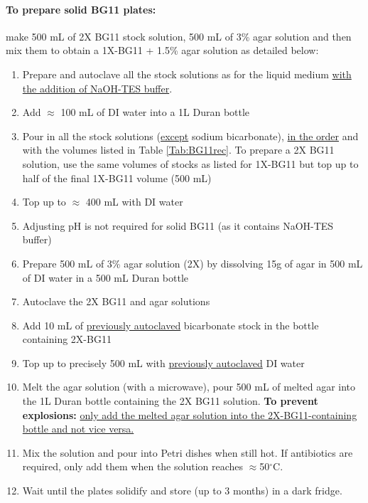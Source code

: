 \documentclass[12pt]{article}
\begin{document}
    \paragraph{To prepare solid BG11 plates:} make 500 mL of 2X BG11 stock solution, 500 mL of 3\% agar solution and then mix them to obtain a 1X-BG11 + 1.5\% agar solution as detailed below:
    \begin{enumerate}
        \item Prepare and autoclave all the stock solutions as for the liquid medium \ul{with the addition of NaOH-TES buffer}.
        \item Add $\approx$ 100 mL of DI water into a 1L Duran bottle
        \item Pour in all the stock solutions (\ul{except} sodium bicarbonate), \underline{in the order} and with the volumes listed in Table \ref{Tab:BG11rec}. To prepare a 2X BG11 solution, use the same volumes of stocks as listed for 1X-BG11 but top up to half of the final 1X-BG11 volume (500 mL)
        \item Top up to $\approx$ 400 mL with DI water
        \item Adjusting pH is not required for solid BG11 (as it contains NaOH-TES buffer)
        \item Prepare 500 mL of 3\% agar solution (2X) by dissolving 15g of agar in 500 mL of DI water in a 500 mL Duran bottle 
        \item Autoclave the 2X BG11 and agar solutions
        \item Add 10 mL of \underline{previously autoclaved} bicarbonate stock in the bottle containing 2X-BG11
        \item Top up to precisely 500 mL with \underline{previously autoclaved} DI water
        \item Melt the agar solution (with a microwave), pour 500 mL of melted agar into the 1L Duran bottle containing the 2X BG11 solution. \textbf{To prevent explosions:} \ul{only add the melted agar solution into the 2X-BG11-containing bottle and not vice versa.}
        \item Mix the solution and pour into Petri dishes when still hot. If antibiotics are required, only add them when the solution reaches $\approx$50$^\circ$C.
        \item Wait until the plates solidify and store (up to 3 months) in a dark fridge.
    \end{enumerate} 
    
\end{document}
